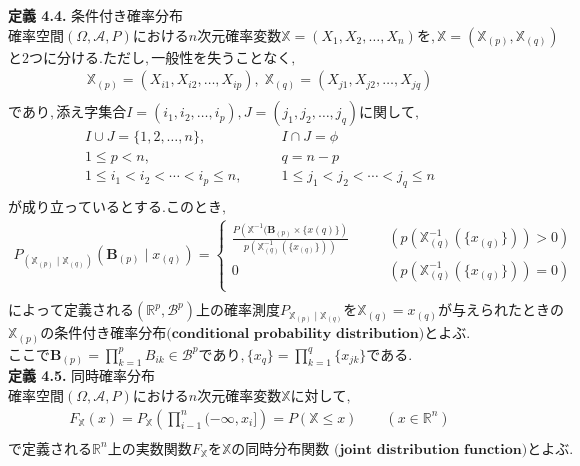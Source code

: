 \documentclass[dvipdfmx,10pt, a4j]{jarticle}
\theoremstyle{definition}
\begin{document}
\noindent
\textbf{定義 4.4.} 条件付き確率分布\\
$確率空間 (\Omega, \mathscr{A}, P)における n次元確率変数 \mathbb{X} = (X_1, X_2, \dots, X_n)を, \mathbb{X} = (\mathbb{X}_{(p)}, \mathbb{X}_{(q)})$
$と2つに分ける. ただし, 一般性を失うことなく,$\\
\begin{align*}
    \mathbb{X}_{(p)} = (X_{i1}, X_{i2}, \dots, X_{ip}),\; \mathbb{X}_{(q)} = (X_{j1}, X_{j2}, \dots, X_{jq})\\
\end{align*}
$であり, 添え字集合 I = (i_1, i_2, \dots, i_p), J = (j_1, j_2, \dots, j_q) に関して,$\\
\begin{align*}
    I \cup J = \{1,2, \dots, n\},& \qquad I \cap J = \phi\\
    1 \leq p < n,& \qquad q = n - p\\
    1 \leq i_1 < i_2 < \cdots < i_p \leq n,& \qquad 1 \leq j_1 < j_2 < \cdots < j_q \leq n\\
\end{align*}
$が成り立っているとする. このとき,$\\
\begin{align*}
    P_{(\mathbb{X}_{(p)} \mid \mathbb{X}_{(q)})}(\mathbf{B}_{(p)} \mid x_{(q)}) =
        \begin{cases}
            \frac{P\left(\mathbb{X}^{-1} (\mathbf{B}_{(p)} \times \{x(q)\}\right)}{p(\mathbb{X}_{(q)}^{-1}(\{x_{(q)}\}))} \qquad &\left(p(\mathbb{X}_{(q)}^{-1}(\{x_{(q)}\})) > 0 \right)\\
            0 \qquad &\left(p(\mathbb{X}_{(q)}^{-1}(\{x_{(q)}\})) = 0 \right)\\
        \end{cases}\\
\end{align*}
$によって定義される(\mathbb{R}^{p}, \mathscr{B}^{p}) 上の確率測度 P_{\mathbb{X}_{(p)} \mid \mathbb{X}_{(q)}} を \mathbb{X}_{(q)} = x_{(q)} が与えられたときの$
$\mathbb{X}_{(p)} の\textbf{条件付き確率分布(conditional probability distribution)} とよぶ.$\\
$ここで\mathbf{B}_{(p)} = \prod_{k=1}^{p} B_{ik} \in \mathscr{B}^{p} であり, \{x_{q}\} = \prod_{k=1}^{q} \{x_{jk}\}である.$\\

\noindent
\textbf{定義 4.5.} 同時確率分布\\
$確率空間 (\Omega, \mathscr{A}, P) における n次元確率変数 \mathbb{X}に対して,$\\
\begin{align*}
    F_{\mathbb{X}}(x) = P_{\mathbb{X}}\left(\prod_{i-1}^{n} (- \infty, x_i] \right) = P(\mathbb{X} \leq x) \qquad (x \in \mathbb{R}^{n})\\
\end{align*}
$で定義される \mathbb{R}^{n} 上の実数関数 F_{\mathbb{X}}を\mathbb{X}の \textbf{同時分布関数 (joint distribution function)} とよぶ.$\\
\end{document}
